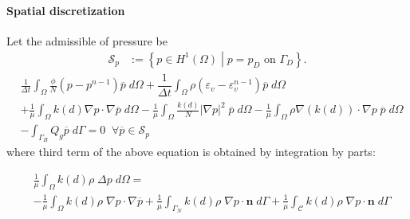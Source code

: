 \paragraph{Spatial discretization}
Let the admissible  of pressure be
\begin{equation*}
    \begin{aligned}
        \mathscr{S}_p &:= \left\{p \in H^1 (\Omega) \middle|
        p = p_D\text{ on }\Gamma_D \right\}.
    \end{aligned}
\end{equation*}
\added{$\cdots$}
\begin{equation}\label{Eq:weak_pressure}
\begin{aligned}
        & \frac{1}{\Delta t} \int_{\Omega} \frac{\phi}{{N}}(p-p^{n-1}) {\overline{p}} \; d\Omega + \dfrac{1}{{\Delta t}}\int_{\Omega} \rho(\varepsilon_v-\varepsilon_v^{n-1}) {\overline{p}} \; d\Omega \\& + \frac{1}{\mu} \int_{\Omega} {k(d)} \nabla p \cdot \nabla {\overline{p}} \; d\Omega   
         -\frac{1}{\mu}\int_{\Omega}  \frac{k(d)}{N}\left|\nabla p\right|^2 \;\overline{p} \; d\Omega  -\frac{1}{\mu}\int_{\Omega}{\rho} \nabla \left(k(d) \right) \cdot \nabla p\;\overline{p} \; d\Omega\\
                  &-\int_{\Gamma_B} Q_g {\overline{p}} \; d\Gamma =0 \; \;\forall {\overline{p}} \in\mathscr{S}_p
\end{aligned}
\end{equation}
 where third term of the above equation is obtained by integration by parts:

\begin{equation}\label{Eq:dis_div}
\begin{aligned}
        & \frac{1}{\mu} \int_{\Omega} k(d)\rho \;\Delta p \; d\Omega=\\&- \frac{1}{\mu} \int_{\Omega}  {k(d)}\rho \; \nabla p \cdot \nabla {\overline{p}} +   \frac{1}{\mu} \int_{\Gamma_N} k(d)\rho\;\nabla p \cdot \bm{n} \; d\Gamma +   \frac{1}{\mu} \int_{\mathcal{C}} k(d)\rho\;\nabla p \cdot \bm{n} \; d\Gamma
\end{aligned}
\end{equation}



